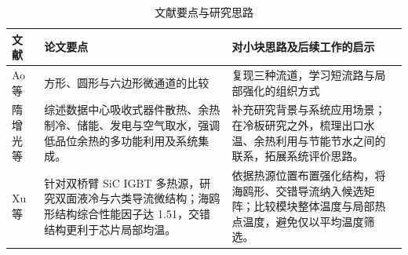 \documentclass[stage1,fontset=fandol]{ydzjreport}
\begin{document}
	\begin{table}[H]
	  \centering
	  \small
	  \renewcommand{\arraystretch}{1.12}
	  \caption{文献要点与研究思路}
	  \label{tab:notes}
	  \begin{tabularx}{\textwidth}{@{}>{\RaggedRight\arraybackslash}p{} Y Y@{}}
	    \toprule
{} 文献 & 论文要点 & 对小块思路及后续工作的启示 \\
	    \midrule
	    Ao 等\cite{ao} & 方形、圆形与六边形微通道的比较 & 复现三种流道，学习短流路与局部强化的组织方式 \\[3pt]
	    隋增光等\cite{ref1} & 综述数据中心吸收式器件散热、余热制冷、储能、发电与空气取水，强调低品位余热的多功能利用及系统集成。 & 补充研究背景与系统应用场景；在冷板研究之外，梳理出口水温、余热利用与节能节水之间的联系，拓展系统评价思路。 \\[3pt]
	    Xu 等\cite{ref2} & 针对双桥臂 SiC IGBT 多热源，研究双面液冷与六类导流微结构；海鸥形结构综合性能因子达 1.51，交错结构更利于芯片局部均温。 & 依据热源位置布置强化结构，将海鸥形、交错导流纳入候选矩阵；比较模块整体温度与局部热点温度，避免仅以平均温度筛选。 \\[3pt]

	    \bottomrule
	  \end{tabularx}
	\end{table}
\end{document}
